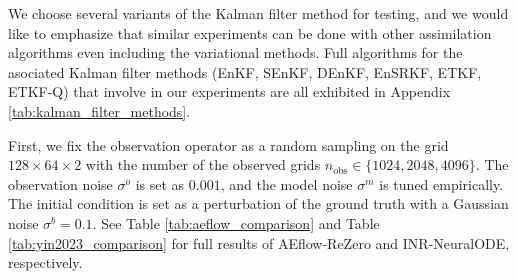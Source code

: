 \documentclass{article}
\begin{document}
We choose several variants of the Kalman filter method for testing, and we would like to emphasize that similar experiments can be done with other assimilation algorithms even including the variational methods. Full algorithms for the asociated Kalman filter methods (EnKF, SEnKF, DEnKF, EnSRKF, ETKF, ETKF-Q) that involve in our experiments are all exhibited in Appendix \ref{tab:kalman_filter_methods}.

First, we fix the observation operator as a random sampling on the grid $128\times64\times2$ with the number of the observed grids $n_{\mathrm{obs}}\in\{1024,2048,4096\}$. The observation noise $\sigma^o$ is set as $0.001$, and the model noise $\sigma^m$ is tuned empirically. The initial condition is set as a perturbation of the ground truth with a Gaussian noise $\sigma^b=0.1$. See Table \ref{tab:aeflow_comparison} and Table \ref{tab:yin2023_comparison} for full results of AEflow-ReZero and INR-NeuralODE, respectively.


\end{document}
